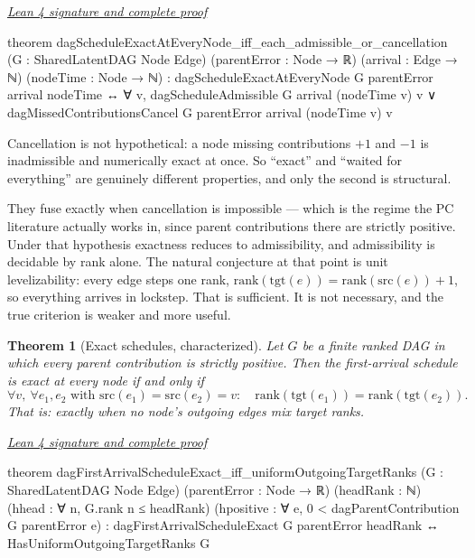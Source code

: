 \documentclass[11pt]{article}
\newtheorem{theorem}{Theorem}[section]
\newcommand{\leancommit}{647168959fc57cfe97526d9525d33e63681b8e2f}
\newcommand{\leansignaturelink}[2]{%
  \par\Needspace{0.3\textheight}\smallskip\noindent
  \href{https://github.com/zariuq/MeTTapedia/blob/\leancommit/#1\#L#2}{%
    \scriptsize\itshape Lean 4 signature and complete proof}\par\nobreak}
\begin{document}
\leansignaturelink{lean/mettapedia/Mettapedia/MachineLearning/NeuralNetworks/%
PredictiveCoding/DAGScheduleExactness.lean}{218}
\begin{leansignature}
theorem dagScheduleExactAtEveryNode_iff_each_admissible_or_cancellation
    (G : SharedLatentDAG Node Edge) (parentError : Node → ℝ)
    (arrival : Edge → ℕ) (nodeTime : Node → ℕ) :
    dagScheduleExactAtEveryNode G parentError arrival nodeTime ↔
      ∀ v,
        dagScheduleAdmissible G arrival (nodeTime v) v ∨
          dagMissedContributionsCancel G parentError arrival (nodeTime v) v
\end{leansignature}

Cancellation is not hypothetical: a node missing contributions $+1$ and $-1$ is
inadmissible and numerically exact at once. So ``exact'' and ``waited for everything''
are genuinely different properties, and only the second is structural.

They fuse exactly when cancellation is impossible --- which is the regime the PC
literature actually works in, since parent contributions there are strictly positive.
Under that hypothesis exactness reduces to admissibility, and admissibility is decidable
by rank alone. The natural conjecture at that point is unit levelizability: every edge
steps one rank, $\mathrm{rank}(\mathrm{tgt}(e)) = \mathrm{rank}(\mathrm{src}(e)) + 1$, so
everything arrives in lockstep. That is sufficient. It is not necessary, and the true
criterion is weaker and more useful.

\begin{theorem}[Exact schedules, characterized]\label{thm:sched}
Let $G$ be a finite ranked DAG in which every parent contribution is strictly positive.
Then the first-arrival schedule is exact at every node if and only if
\[
\forall v,\ \forall e_1, e_2 \text{ with } \mathrm{src}(e_1)=\mathrm{src}(e_2)=v:\quad
\mathrm{rank}(\mathrm{tgt}(e_1)) = \mathrm{rank}(\mathrm{tgt}(e_2)).
\]
That is: exactly when no node's outgoing edges mix target ranks.
\end{theorem}

\leansignaturelink{lean/mettapedia/Mettapedia/MachineLearning/NeuralNetworks/%
PredictiveCoding/DAGScheduleExactness.lean}{727}
\begin{leansignature}
theorem dagFirstArrivalScheduleExact_iff_uniformOutgoingTargetRanks
    (G : SharedLatentDAG Node Edge) (parentError : Node → ℝ)
    (headRank : ℕ) (hhead : ∀ n, G.rank n ≤ headRank)
    (hpositive : ∀ e, 0 < dagParentContribution G parentError e) :
    dagFirstArrivalScheduleExact G parentError headRank ↔
      HasUniformOutgoingTargetRanks G
\end{leansignature}
\end{document}
